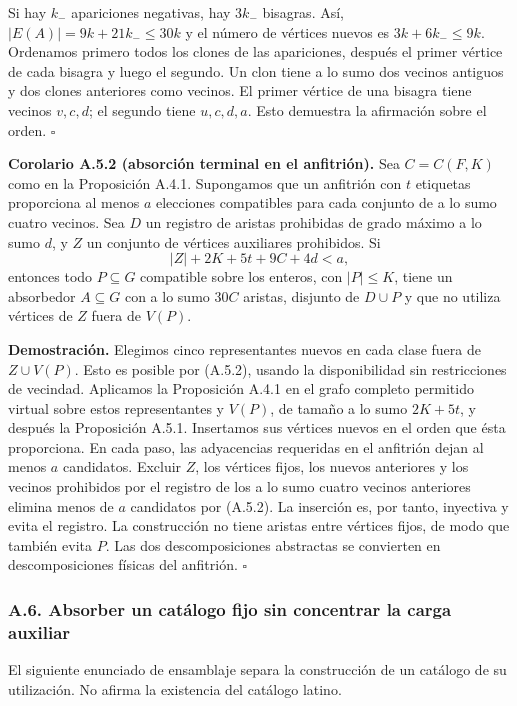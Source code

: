 \documentclass[spanish,11pt,a4paper]{article}
\begin{document}
Si hay \(k_-\) apariciones negativas, hay \(3k_-\) bisagras. Así, \(|E(A)|=9k+21k_-\le30k\) y el número de vértices nuevos es \(3k+6k_-\le9k\). Ordenamos primero todos los clones de las apariciones, después el primer vértice de cada bisagra y luego el segundo. Un clon tiene a lo sumo dos vecinos antiguos y dos clones anteriores como vecinos. El primer vértice de una bisagra tiene vecinos \(v,c,d\); el segundo tiene \(u,c,d,a\). Esto demuestra la afirmación sobre el orden. \(\square\)

\textbf{Corolario A.5.2 (absorción terminal en el anfitrión).} Sea \(C=C(F,K)\) como en la Proposición A.4.1. Supongamos que un anfitrión con \(t\) etiquetas proporciona al menos \(a\) elecciones compatibles para cada conjunto de a lo sumo cuatro vecinos. Sea \(D\) un registro de aristas prohibidas de grado máximo a lo sumo \(d\), y \(Z\) un conjunto de vértices auxiliares prohibidos. Si \[|Z|+2K+5t+9C+4d<a,
\tag{A.5.2}\] entonces todo \(P\subseteq G\) compatible sobre los enteros, con \(|P|\le K\), tiene un absorbedor \(A\subseteq G\) con a lo sumo \(30C\) aristas, disjunto de \(D\cup P\) y que no utiliza vértices de \(Z\) fuera de \(V(P)\).

\textbf{Demostración.} Elegimos cinco representantes nuevos en cada clase fuera de \(Z\cup V(P)\). Esto es posible por (A.5.2), usando la disponibilidad sin restricciones de vecindad. Aplicamos la Proposición A.4.1 en el grafo completo permitido virtual sobre estos representantes y \(V(P)\), de tamaño a lo sumo \(2K+5t\), y después la Proposición A.5.1. Insertamos sus vértices nuevos en el orden que ésta proporciona. En cada paso, las adyacencias requeridas en el anfitrión dejan al menos \(a\) candidatos. Excluir \(Z\), los vértices fijos, los nuevos anteriores y los vecinos prohibidos por el registro de los a lo sumo cuatro vecinos anteriores elimina menos de \(a\) candidatos por (A.5.2). La inserción es, por tanto, inyectiva y evita el registro. La construcción no tiene aristas entre vértices fijos, de modo que también evita \(P\). Las dos descomposiciones abstractas se convierten en descomposiciones físicas del anfitrión. \(\square\)

\subsubsection{A.6. Absorber un catálogo fijo sin concentrar la carga auxiliar}\label{a.6.-absorber-un-catuxe1logo-fijo-sin-concentrar-la-carga-auxiliar}

El siguiente enunciado de ensamblaje separa la construcción de un catálogo de su utilización. No afirma la existencia del catálogo latino.
\end{document}
